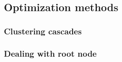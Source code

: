 \subsection{Optimization methods}
\subsubsection{Clustering cascades}

\subsubsection{Dealing with root node}